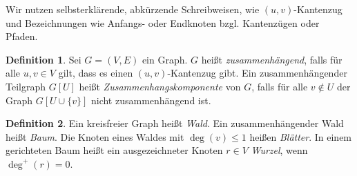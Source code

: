 \documentclass[11pt, a4paper]{article}
\theoremstyle{definition}
\newtheorem{definition}{Definition}[section]
\theoremstyle{plain}
\numberwithin{equation}{section}
\begin{document}
Wir nutzen selbsterklärende, abkürzende Schreibweisen, wie $(u, v)$-Kantenzug und Bezeichnungen wie Anfangs- oder Endknoten bzgl. Kantenzügen oder Pfaden.
\begin{definition}
	Sei $G = (V, E)$ ein Graph. $G$ heißt \textit{zusammenhängend}, falls für alle $u, v \in V$ gilt, dass es einen $(u, v)$-Kantenzug gibt. Ein zusammenhängender Teilgraph $G[U]$ heißt \textit{Zusammenhangskomponente} von $G$, falls für alle $v \notin U$ der Graph $G[U \cup \{v\}]$ nicht zusammenhängend ist.
\end{definition}
\begin{definition}
	Ein kreisfreier Graph heißt \textit{Wald}. Ein zusammenhängender Wald heißt \textit{Baum}. Die Knoten eines Waldes mit $\deg(v) \leq 1$ heißen \textit{Blätter}. In einem gerichteten Baum heißt ein ausgezeichneter Knoten $r \in V$ \textit{Wurzel}, wenn $\deg^+(r) = 0$.
\end{definition}
\end{document}
